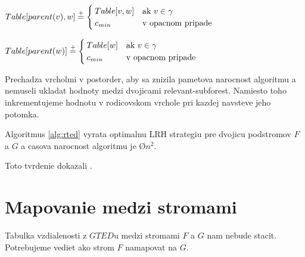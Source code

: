 \begin{algorithm}
\begin{algorithmic}[1]
  \item[]

      \State $Table[parent(v), w] \stackrel{+}{=}
        \begin{cases}
          Table[v, w] & \text{ak $v \in \gamma$}
          \\
          c_{min} & \text{v opacnom pripade}
        \end{cases}$
    \EndProcedure

      \State $Table[parent(w)] \stackrel{+}{=}
        \begin{cases}
          Table[w] & \text{ak $v \in \gamma$}
          \\
          c_{min} & \text{v opacnom pripade}
        \end{cases}$
    \EndProcedure
  \end{algorithmic}
\end{algorithm}

Prechadza vrcholmi v postorder, aby sa znizila pametova narocnost algoritmu a nemuseli ukladat hodnoty
medzi dvojicami relevant-subforest. Namiesto toho inkrementujeme hodnotu v rodicovskom vrchole pri
kazdej navsteve jeho potomka.

\begin{lemma}
  Algoritmus \ref{alg:rted} vyrata optimalnu LRH strategiu pre dvojicu podstromov $F$ a $G$ a
  casova narocnost algoritmu je \O{$n^2$}.
\end{lemma}

\begin{dukaz}
  Toto tvrdenie dokazali \citet{RTED}.
\end{dukaz}


\section{Mapovanie medzi stromami}

Tabulka vzdialenosti z $GTED$u medzi stromami $F$ a $G$ nam nebude stacit.
Potrebujeme vediet ako strom $F$ namapovat na $G$.

